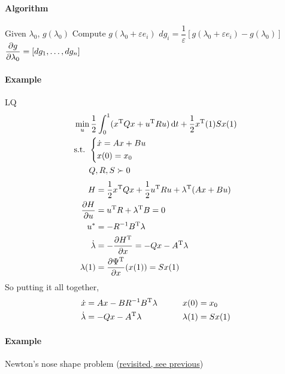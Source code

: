 \paragraph{Algorithm} \mbox{}
\begin{algorithm}
  \begin{algorithmic}
    \State Given $\lambda_0$, $g(\lambda_0)$
    \State Compute $g(\lambda_0+\varepsilon e_i)$
    \State $dg_i = \dfrac{1}{\varepsilon} [g(\lambda_0+\varepsilon e_i) - g(\lambda_0)]$
    \EndFor
    \smallskip
    \State $\displaystyle\frac{\partial g}{\partial \lambda_0} = [dg_1,\dots,dg_n]$
  \end{algorithmic}
\end{algorithm}

\paragraph{Example} LQ
\begin{align}
  & \min_u \frac12 \int_0^1 (x\trans Qx + u\trans Ru) \dif t + \frac12 x\trans(1)Sx(1) \\
  & \text{s.t. } \begin{dcases}
    \dot x = Ax + Bu \\
    x(0) = x_0
  \end{dcases} \\
  & \phantom{\text{s.t. }} Q,R,S \succ 0
\end{align}
\begin{align}
  H &= \frac12 x^\text{T} Qx + \frac12 u^\text{T} Ru + \lambda^\text{T}(Ax+Bu) \\
  \frac{\partial H}{\partial u} &= u^\text{T} R + \lambda^\text{T} B = 0 \\
  u^* &= -R^{-1}B^\text{T} \lambda \\
  \dot\lambda &= -\frac{\partial H^\text{T}}{\partial x} = -Qx - A^\text{T}\lambda \\
  \lambda(1) &= \frac{\partial \Psi^\text{T}}{\partial x}(x(1)) = Sx(1)
\end{align}
So putting it all together,
\begin{alignat}{2}
  \dot x &= Ax - BR^{-1}B^\text{T}\lambda \qquad & x(0) &= x_0 \\
  \dot\lambda &= -Qx - A^\text{T}\lambda & \lambda(1) &= Sx(1)
\end{alignat}

\paragraph{Example} Newton's nose shape problem (\hyperlink{newton_nose_shape}{revisited, see previous})

